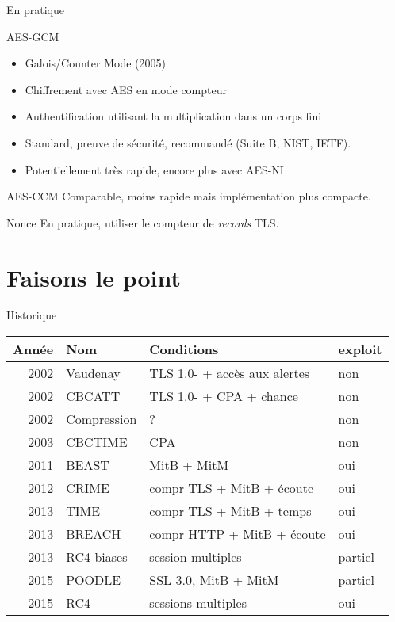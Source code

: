 \documentclass{mpg-ep-slides}
\begin{document}
\begin{frame}{En pratique}
  \begin{block}{AES-GCM}
    \begin{itemize}
      \item Galois/Counter Mode (2005)
      \item Chiffrement avec AES en mode compteur
      \item Authentification utilisant la multiplication dans un corps fini
      \item Standard, preuve de sécurité, recommandé (Suite B, NIST, IETF).
      \item Potentiellement très rapide, encore plus avec AES-NI
    \end{itemize}
  \end{block}

  \begin{block}{AES-CCM}
    Comparable, moins rapide mais implémentation plus compacte.
  \end{block}

  \begin{block}{Nonce}
    En pratique, utiliser le compteur de \emph{records} TLS.
  \end{block}
\end{frame}


\section[Point]{Faisons le point}
\tocsect

\begin{frame}{Historique}
  \begin{tabular}{rlll}
    \toprule
    Année & Nom & Conditions & exploit \\
    \midrule
    2002 & Vaudenay   & TLS 1.0- + accès aux alertes    & non \\
    2002 & CBCATT     & TLS 1.0- + CPA + chance         & non \\
    2002 & Compression & ?                              & non \\
    2003 & CBCTIME    & CPA                             & non \\
    2011 & BEAST      & MitB + MitM                     & oui \\
    2012 & CRIME      & compr TLS + MitB + écoute       & oui \\
    2013 & TIME       & compr TLS + MitB + temps        & oui \\
    2013 & BREACH     & compr HTTP + MitB + écoute      & oui \\
    2013 & RC4 biases & session multiples               & partiel \\
    2015 & POODLE     & SSL 3.0, MitB + MitM            & partiel \\
    2015 & RC4        & sessions multiples              & oui \\
    \bottomrule
  \end{tabular}
\end{frame}
\end{document}
